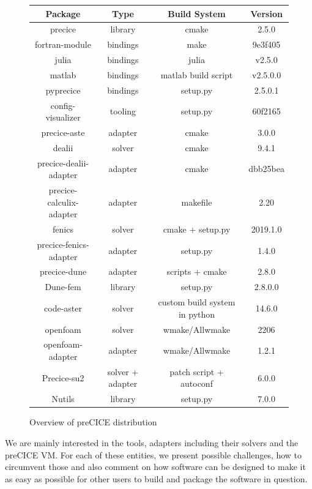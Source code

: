 \documentclass[conference,final,a4paper]{IEEEtran}
\begin{document}
\begin{figure}[!t]
  \normalsize
  \caption{Overview of preCICE distribution}
  \label{table:label-distribution}
  \centering
  \begin{tabular}{|c|c|c|c|}
    \hline
    \bfseries Package & \bfseries Type & \bfseries Build System & \bfseries Version \\
    \hline
    precice & library & cmake & 2.5.0 \\
    \hline
    fortran-module & bindings & make & 9e3f405 \\
    \hline
    julia & bindings & julia & v2.5.0 \\
    \hline
    matlab & bindings & matlab build script & v2.5.0.0 \\
    \hline
    pyprecice & bindings & setup.py & 2.5.0.1 \\
    \hline
    config-visualizer & tooling & setup.py & 60f2165 \\
    \hline
    precice-aste & adapter & cmake & 3.0.0 \\
    \hline
    dealii & solver & cmake & 9.4.1 \\
    \hline
    precice-dealii-adapter & adapter & cmake & dbb25bea \\
    \hline
    precice-calculix-adapter & adapter & makefile & 2.20 \\
    \hline
    fenics & solver & cmake + setup.py & 2019.1.0 \\
    \hline
    precice-fenics-adapter & adapter & setup.py & 1.4.0 \\
    \hline
    precice-dune & adapter & scripts + cmake & 2.8.0 \\
    \hline
    Dune-fem & library & setup.py & 2.8.0.0 \\
    \hline
    code-aster & solver & custom build system in python & 14.6.0 \\
    \hline
    openfoam & solver & wmake/Allwmake & 2206 \\
    \hline
    openfoam-adapter & adapter & wmake/Allwmake & 1.2.1 \\
    \hline
    Precice-su2 & solver + adapter & patch script + autoconf & 6.0.0 \\
    \hline
    Nutils & library & setup.py & 7.0.0 \\
    \hline
  \end{tabular}
\end{figure}


We are mainly interested in the tools, adapters including their solvers and the preCICE VM.
For each of these entities, we present possible challenges, how to circumvent those and also comment on how software can be designed to make it as easy as possible for other users to build and package the software in question.
\end{document}
